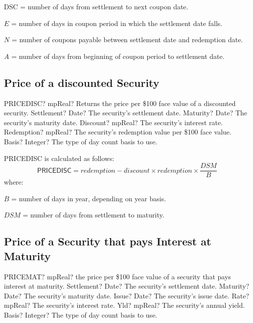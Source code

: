 DSC = number of days from settlement to next coupon date.

$E$ = number of days in coupon period in which the settlement date falls.

$N$ = number of coupons payable between settlement date and redemption date.

$A$ = number of days from beginning of coupon period to settlement date.



\subsection{Price of a discounted Security}


\begin{mpFunctionsExtract}
	\mpWorksheetFunctionFiveNotImplemented
	{PRICEDISC? mpReal? Returns the price per \$100 face value of a discounted security.}
	{Settlement? Date?  The security's settlement date.}
	{Maturity? Date? The security's maturity date.}
	{Discount? mpReal? The security's interest rate.}
	{Redemption? mpReal? The security's redemption value per \$100 face value.}
	{Basis? Integer? The type of day count basis to use.}
\end{mpFunctionsExtract}

\vspace{0.3cm}
PRICEDISC is calculated as follows:
\begin{equation}
	\textsf{PRICEDISC} = redemption - discount \times redemption \times \frac{DSM}{B}
\end{equation}
where:

$B$ = number of days in year, depending on year basis.

$DSM$ = number of days from settlement to maturity.




\subsection{Price of a Security that pays Interest at Maturity}

\begin{mpFunctionsExtract}
	\mpWorksheetFunctionSixNotImplemented
	{PRICEMAT? mpReal? the price per \$100 face value  of a security that pays interest at maturity.}
	{Settlement? Date?  The security's settlement date.}
	{Maturity? Date? The security's maturity date.}
	{Issue? Date? The security's issue date.}
	{Rate? mpReal? The security's interest rate.}
	{Yld? mpReal? The security's annual yield.}
	{Basis? Integer? The type of day count basis to use.}
\end{mpFunctionsExtract}


